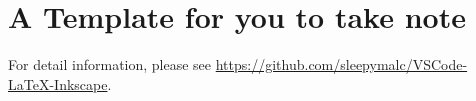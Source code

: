 \section{A Template for you to take note}
For detail information, please see \url{https://github.com/sleepymalc/VSCode-LaTeX-Inkscape}.
